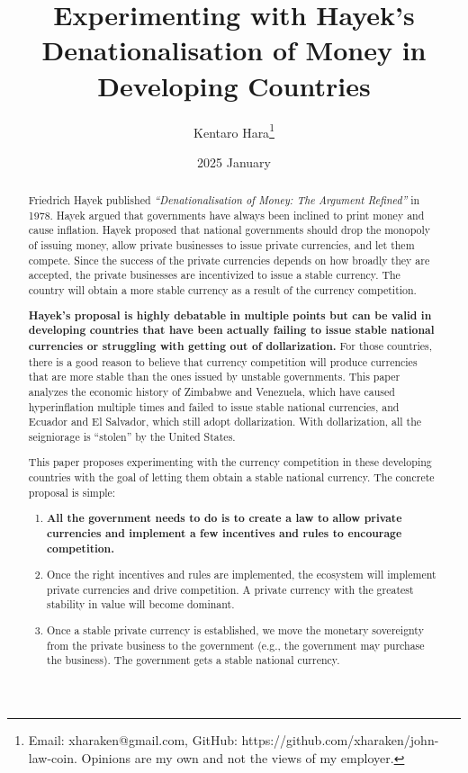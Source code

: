 \documentclass[dvipdfmx,a4paper]{article}
\title{\textbf{Experimenting with Hayek's Denationalisation of Money in Developing Countries}}
\author{Kentaro Hara\footnote{Email: xharaken@gmail.com, GitHub: https://github.com/xharaken/john-law-coin. Opinions are my own and not the views of my employer.}}
\date{2025 January}
\begin{document}
\maketitle

\begin{abstract}

Friedrich Hayek published \textit{``Denationalisation of Money: The Argument Refined''} in 1978. Hayek argued that governments have always been inclined to print money and cause inflation. Hayek proposed that national governments should drop the monopoly of issuing money, allow private businesses to issue private currencies, and let them compete. Since the success of the private currencies depends on how broadly they are accepted, the private businesses are incentivized to issue a stable currency. The country will obtain a more stable currency as a result of the currency competition.

\textbf{Hayek's proposal is highly debatable in multiple points but can be valid in developing countries that have been actually failing to issue stable national currencies or struggling with getting out of dollarization.} For those countries, there is a good reason to believe that currency competition will produce currencies that are more stable than the ones issued by unstable governments. This paper analyzes the economic history of Zimbabwe and Venezuela, which have caused hyperinflation multiple times and failed to issue stable national currencies, and Ecuador and El Salvador, which still adopt dollarization. With dollarization, all the seigniorage is ``stolen'' by the United States.
  
This paper proposes experimenting with the currency competition in these developing countries with the goal of letting them obtain a stable national currency. The concrete proposal is simple:

\begin{enumerate}
\item \textbf{All the government needs to do is to create a law to allow private currencies and implement a few incentives and rules to encourage competition.}
\item Once the right incentives and rules are implemented, the ecosystem will implement private currencies and drive competition. A private currency with the greatest stability in value will become dominant.
\item Once a stable private currency is established, we move the monetary sovereignty from the private business to the government (e.g., the government may purchase the business). The government gets a stable national currency.
\end{enumerate}

\end{abstract}
\end{document}
